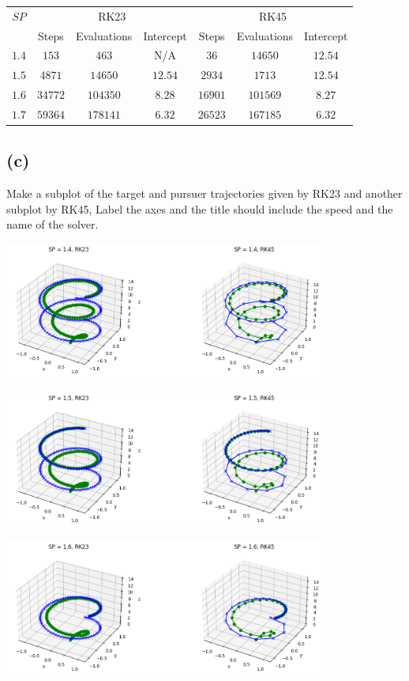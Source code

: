 \documentclass[11pt]{article}
\begin{document}
\begin{table}[h]
  \centering
  \begin{tabular}{c|ccc|ccc}
  \hline
  $SP$ & \multicolumn{3}{c|}{RK23} & \multicolumn{3}{c}{RK45} \\
   & Steps & Evaluations & Intercept & Steps & Evaluations & Intercept \\
  \hline
  $1.4$ & $153$ & $463$ & N/A & $36$ & $14650$ & $12.54$ \\
  $1.5$ & $4871$ & $14650$ & $12.54$ & $2934$ & $1713$ & $12.54$ \\
  $1.6$ & $34772$ & $104350$ & $8.28$ & $16901$ & $101569$ & $8.27$ \\
  $1.7$ & $59364$ & $178141$ & $6.32$ & $26523$ & $167185$ & $6.32$ \\
  \hline
  \end{tabular}
\end{table}
    
  
\subsection{(c)} Make a subplot of the target and pursuer trajectories given by RK23 and another subplot by RK45, Label the axes and the title should include the speed and the name of the solver.

\includegraphics[width=300pt]{a2q6_1.png}

\includegraphics[width=300pt]{a2q6_2.png}

\includegraphics[width=300pt]{a2q6_3.png}
\end{document}
